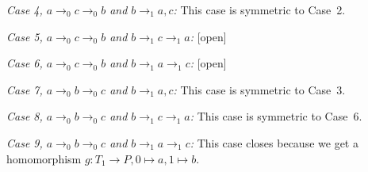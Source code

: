 \documentclass[a4paper]{article}
\newcommand{\case}[2]{\vspace{1ex}\noindent\textit{Case #1, #2:}}
\begin{document}
\case{4}{$a \rightarrow_0 c \rightarrow_0 b$ and $b \rightarrow_1 a,c$}
This case is symmetric to Case~2.

\case{5}{$a \rightarrow_0 c \rightarrow_0 b$ and $b \rightarrow_1 c
\rightarrow_1 a$} 
[open]

\case{6}{$a \rightarrow_0 c \rightarrow_0 b$ and $b \rightarrow_1 a \rightarrow_1 c$}
[open]


\case{7}{$a \rightarrow_0 b \rightarrow_0 c$ and $b \rightarrow_1 a,c$}
This case is symmetric to Case~3.

\case{8}{$a \rightarrow_0 b \rightarrow_0 c$ and $b \rightarrow_1 c \rightarrow_1 a$} 
This case is symmetric to Case~6.

\case{9}{$a \rightarrow_0 b \rightarrow_0 c$ and $b \rightarrow_1 a
\rightarrow_1 c$} This case closes because we get a homomorphism $g :
T_1 \to P, 0 \mapsto a, 1 \mapsto b$.
\end{document}
